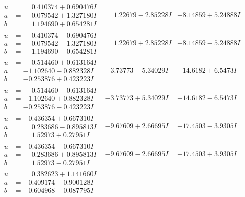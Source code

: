 \documentclass[1p]{elsarticle_modified}
\theoremstyle{definition}
\begin{document}
$$\begin{array}{c|c|c}
\begin{aligned}
u &= \phantom{-}0.410374 + 0.690476 I \\
a &= \phantom{-}0.079542 + 1.327180 I \\
b &= \phantom{-}1.194690 + 0.654281 I\end{aligned}
 & \phantom{-}1.22679 - 2.85228 I & -8.14859 + 5.24888 I \\ \hline\begin{aligned}
u &= \phantom{-}0.410374 - 0.690476 I \\
a &= \phantom{-}0.079542 - 1.327180 I \\
b &= \phantom{-}1.194690 - 0.654281 I\end{aligned}
 & \phantom{-}1.22679 + 2.85228 I & -8.14859 - 5.24888 I \\ \hline\begin{aligned}
u &= \phantom{-}0.514460 + 0.613164 I \\
a &= -1.102640 - 0.882328 I \\
b &= -0.253876 + 0.423223 I\end{aligned}
 & -3.73773 - 5.34029 I & -14.6182 + 6.5473 I \\ \hline\begin{aligned}
u &= \phantom{-}0.514460 - 0.613164 I \\
a &= -1.102640 + 0.882328 I \\
b &= -0.253876 - 0.423223 I\end{aligned}
 & -3.73773 + 5.34029 I & -14.6182 - 6.5473 I \\ \hline\begin{aligned}
u &= -0.436354 + 0.667310 I \\
a &= \phantom{-}0.283686 - 0.895813 I \\
b &= \phantom{-}1.52973 + 0.27951 I\end{aligned}
 & -9.67609 + 2.66695 I & -17.4503 - 3.9305 I \\ \hline\begin{aligned}
u &= -0.436354 - 0.667310 I \\
a &= \phantom{-}0.283686 + 0.895813 I \\
b &= \phantom{-}1.52973 - 0.27951 I\end{aligned}
 & -9.67609 - 2.66695 I & -17.4503 + 3.9305 I \\ \hline\begin{aligned}
u &= \phantom{-}0.382623 + 1.141660 I \\
a &= -0.409174 - 0.900128 I \\
b &= -0.604968 - 0.087795 I\end{aligned}

\end{array}$$
\end{document}

